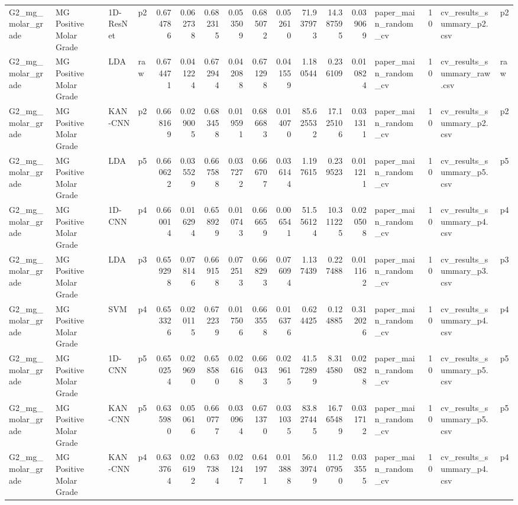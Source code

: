 \begin{tabular}{llllrrrrrrrrrlrll}
G2_mg_molar_grade & MG Positive Molar Grade & 1D-ResNet & p2 & 0.674786 & 0.062738 & 0.682315 & 0.053509 & 0.685072 & 0.052610 & 71.937973 & 14.387595 & 0.039069 & paper_main_random_cv & 10 & cv_results_summary_p2.csv & p2 \\
G2_mg_molar_grade & MG Positive Molar Grade & LDA & raw & 0.674471 & 0.041224 & 0.672944 & 0.042088 & 0.671298 & 0.041559 & 1.180544 & 0.236109 & 0.010824 & paper_main_random_cv & 10 & cv_results_summary_raw.csv & raw \\
G2_mg_molar_grade & MG Positive Molar Grade & KAN-CNN & p2 & 0.668169 & 0.029005 & 0.683458 & 0.019591 & 0.686683 & 0.014070 & 85.625532 & 17.125106 & 0.031311 & paper_main_random_cv & 10 & cv_results_summary_p2.csv & p2 \\
G2_mg_molar_grade & MG Positive Molar Grade & LDA & p5 & 0.660622 & 0.035529 & 0.667588 & 0.037272 & 0.666707 & 0.036144 & 1.197615 & 0.239523 & 0.011211 & paper_main_random_cv & 10 & cv_results_summary_p5.csv & p5 \\
G2_mg_molar_grade & MG Positive Molar Grade & 1D-CNN & p4 & 0.660014 & 0.016294 & 0.658929 & 0.010743 & 0.666659 & 0.006541 & 51.556124 & 10.311225 & 0.020508 & paper_main_random_cv & 10 & cv_results_summary_p4.csv & p4 \\
G2_mg_molar_grade & MG Positive Molar Grade & LDA & p3 & 0.659298 & 0.078146 & 0.669158 & 0.072513 & 0.668293 & 0.076094 & 1.137439 & 0.227488 & 0.011162 & paper_main_random_cv & 10 & cv_results_summary_p3.csv & p3 \\
G2_mg_molar_grade & MG Positive Molar Grade & SVM & p4 & 0.653326 & 0.020115 & 0.672239 & 0.017506 & 0.663558 & 0.016376 & 0.624425 & 0.124885 & 0.312026 & paper_main_random_cv & 10 & cv_results_summary_p4.csv & p4 \\
G2_mg_molar_grade & MG Positive Molar Grade & 1D-CNN & p5 & 0.650254 & 0.029690 & 0.658580 & 0.026168 & 0.660433 & 0.029615 & 41.572899 & 8.314580 & 0.020828 & paper_main_random_cv & 10 & cv_results_summary_p5.csv & p5 \\
G2_mg_molar_grade & MG Positive Molar Grade & KAN-CNN & p5 & 0.635980 & 0.050616 & 0.660777 & 0.030964 & 0.671370 & 0.031035 & 83.827445 & 16.765489 & 0.031712 & paper_main_random_cv & 10 & cv_results_summary_p5.csv & p5 \\
G2_mg_molar_grade & MG Positive Molar Grade & KAN-CNN & p4 & 0.633764 & 0.026192 & 0.637384 & 0.021247 & 0.641971 & 0.013888 & 56.039749 & 11.207950 & 0.033555 & paper_main_random_cv & 10 & cv_results_summary_p4.csv & p4 \\

\end{tabular}
